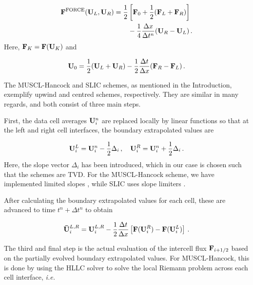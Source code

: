 \documentclass[final,3p,twocolumn,times]{elsarticle}
\begin{document}
\begin{align} 
    \nonumber 
    {\bf F}^{\rm FORCE}({\bf U}_L,{\bf U}_R) = \frac{1}{2}
    &\left[ {\bf F}_0 + \frac{1}{2} ({\bf F}_L + {\bf F}_{R})
    \right] \\
    \label{eq:FORCE} 
    &- \frac{1}{4} \frac{\Delta x}{\Delta t^n} ({\bf U}_{R} - {\bf
    U}_L) \,.  
\end{align}
%
Here, ${\bf F}_K = {\bf F}({\bf U}_K)$ and 

\begin{equation}
    \label{eq:richtmyer}
    {\bf U}_0 = \frac{1}{2}({\bf U}_L+{\bf U}_R) -
    \frac{1}{2} \frac{\Delta t}{\Delta x}({\bf F}_R - {\bf F}_L) \,.
\end{equation}

The MUSCL-Hancock \cite{van1979towards} and SLIC \cite{toro2000centred}
schemes, as mentioned in the Introduction, exemplify upwind and centred
schemes, respectively. They are similar in many regards, and both consist of
three main steps. 

First, the data cell averages ${\bf U}_i^n$ are replaced
locally by linear functions so that at the left and right cell interfaces, the
boundary extrapolated values are 

\begin{equation}
    \label{eq:BEV}
    {\bf U}_i^L = {\bf U}_i^n-\frac{1}{2}\Delta_i \,,\quad 
    {\bf U}_i^R = {\bf U}_i^n+\frac{1}{2}\Delta_i \,.
\end{equation}
%
Here, the slope vector $\Delta_i$ has been introduced, which in our case is
chosen such that the schemes are TVD. For the MUSCL-Hancock scheme, we have
implemented limited slopes \cite{anderson1986comparison}, while SLIC uses slope
limiters \cite{toro2000centred}. 

After calculating the boundary extrapolated values for each cell, these are
advanced to time $t^n+\Delta t^n$ to obtain

\begin{equation}
    \label{eq:evolution}
    {\bf \bar{U}}_i^{L,R} = {\bf U}_i^{L,R} - \frac{1}{2} \frac{\Delta
    t}{\Delta x} \left[ {\bf F}({\bf U}_i^R)-{\bf F}({\bf U}_i^L) \right] \,.
\end{equation}

The third and final step is the actual evaluation of the intercell flux ${\bf
F}_{i+1/2}$ based on the partially evolved boundary extrapolated values. For
MUSCL-Hancock, this is done by using the HLLC solver to solve the local Riemann
problem across each cell interface, \emph{i.e.~} 
\end{document}
